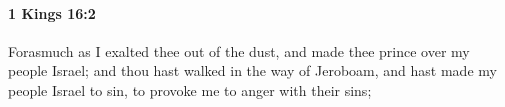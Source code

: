 
		\paragraph{1 Kings 16:2} %
			\label{1KINGS-16-2}

			Forasmuch as I exalted thee out of the dust, and made thee prince over my people Israel; and thou hast walked in the way of Jeroboam, and hast made my people Israel to sin, to provoke me to anger with their sins;


